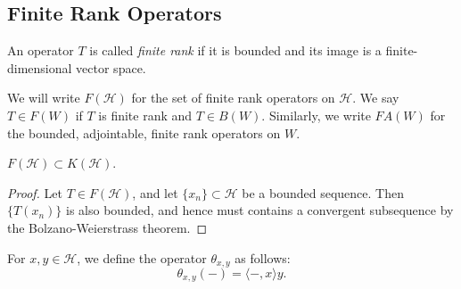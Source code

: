\documentclass[12pt]{article}
\begin{document}

\subsection{Finite Rank Operators} %

\begin{definition}
	An operator $T$ is called \emph{finite rank} if it is bounded and its image is a finite-dimensional vector space. 
\end{definition}

We will write $F(\mathcal{H})$ for the set of finite rank operators on $\mathcal{H}$. We say $T\in F(W)$ if $T$ is finite rank and $T\in B(W)$. Similarly, we write $FA(W)$ for the bounded, adjointable, finite rank operators on $W$.

\begin{lemma}
	$F(\mathcal{H})\subset K(\mathcal{H})$.
\end{lemma}
\begin{proof}
	Let $T\in F(\mathcal{H})$, and let $\{x_n\}\subset\mathcal{H}$ be a bounded sequence. Then $\{T(x_n)\}$ is also bounded, and hence must contains a convergent subsequence by the Bolzano-Weierstrass theorem.
\end{proof}

For $x,y\in\mathcal{H}$, we define the operator $\theta_{x,y}$ as follows:
\begin{equation*}
	\theta_{x,y}(-)=\langle -, x\rangle y.
\end{equation*}
\end{document}

